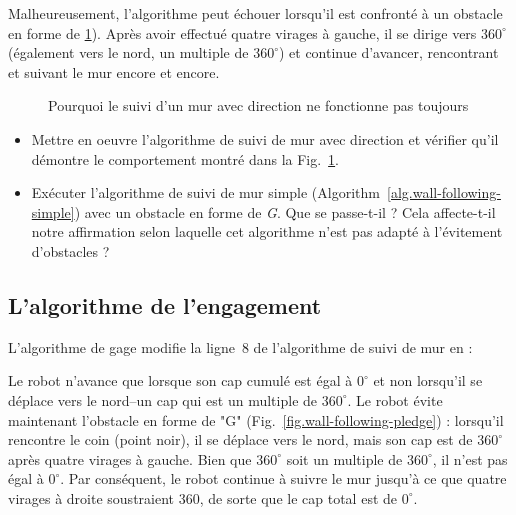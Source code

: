 Malheureusement, l'algorithme peut échouer lorsqu'il est confronté à un obstacle en forme de \ref{fig.wall-direction-bug}). Après avoir effectué quatre virages à gauche, il se dirige vers $360^\circ$ (également vers le nord, un multiple de $360^\circ$) et continue d'avancer, rencontrant et suivant le mur encore et encore.

\begin{figure}
\begin{center}
\caption{Pourquoi le suivi d'un mur avec direction ne fonctionne pas toujours}\label{fig.wall-direction-bug}
\end{center}
\end{figure}

\begin{framed}
\begin{itemize}
\item Mettre en oeuvre l'algorithme de suivi de mur avec direction et vérifier qu'il démontre le comportement montré dans la Fig.~\ref{fig.wall-direction-bug}.
\item Exécuter l'algorithme de suivi de mur simple (Algorithm~\ref{alg.wall-following-simple}) avec un obstacle en forme de \emph{G}. Que se passe-t-il ? Cela affecte-t-il notre affirmation selon laquelle cet algorithme n'est pas adapté à l'évitement d'obstacles ?
\end{itemize}
\end{framed}

\subsection{L'algorithme de l'engagement}

L'algorithme de gage modifie la ligne~8 de l'algorithme de suivi de mur en :
\begin{quote}
\normalsize {}
\end{quote}
Le robot n'avance que lorsque son cap cumulé est égal à $0^\circ$ et non lorsqu'il se déplace vers le nord--un cap qui est un multiple de $360^\circ$. Le robot évite maintenant l'obstacle en forme de "G" (Fig.~\ref{fig.wall-following-pledge}) : lorsqu'il rencontre le coin (point noir), il se déplace vers le nord, mais son cap est de $360^\circ$ après quatre virages à gauche. Bien que $360^\circ$ soit un multiple de $360^\circ$, il n'est pas égal à $0^\circ$. Par conséquent, le robot continue à suivre le mur jusqu'à ce que quatre virages à droite soustraient $360$, de sorte que le cap total est de $0^\circ$.

